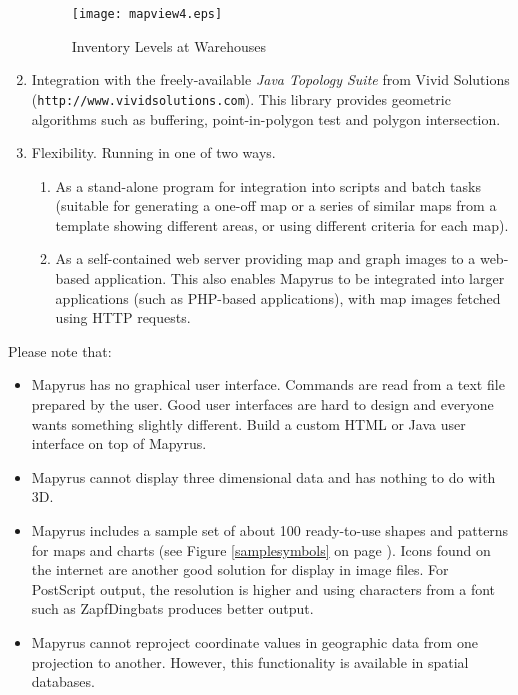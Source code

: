 \begin{enumerate}
\begin{figure}
\texttt{[image: mapview4.eps]}
\caption{Inventory Levels at Warehouses}
\label{mapview4}
\end{figure}


\item
Integration with the freely-available
\textit{Java Topology Suite} from Vivid Solutions
(\texttt{http://www.vividsolutions.com}).
This library provides geometric algorithms
such as buffering, point-in-polygon test and polygon intersection.

\item
Flexibility.  Running in one of two ways.

\begin{enumerate}
\item
As a stand-alone program for integration into
scripts and batch tasks (suitable for generating a one-off
map or a series of similar maps from a template
showing different areas, or using different criteria for each map).

\item
As a self-contained web server providing map and
graph images to a web-based application.
This also enables Mapyrus to be integrated into larger applications
(such as PHP-based applications),
with map images fetched using HTTP requests.

\end{enumerate}

\end{enumerate}


Please note that:

\begin{itemize}

\item
Mapyrus has no graphical user interface.
Commands are read from a text file prepared by the user.
Good user interfaces are
hard to design and everyone wants something slightly different.
Build a custom HTML or Java user interface on top of Mapyrus.

\item
Mapyrus cannot display three dimensional data and has nothing to do
with 3D.

\item
Mapyrus includes a sample set of about 100 ready-to-use shapes and patterns
for maps and charts (see Figure \ref{samplesymbols}
on page \pageref{samplesymbols}).
Icons found on the
internet are another good solution for display in image files.
For PostScript output, the resolution is higher and using characters
from a font such as ZapfDingbats produces better output.

\item
Mapyrus cannot reproject coordinate values in geographic data from
one projection to another.  However, this functionality
is available in spatial databases.
\end{itemize}

